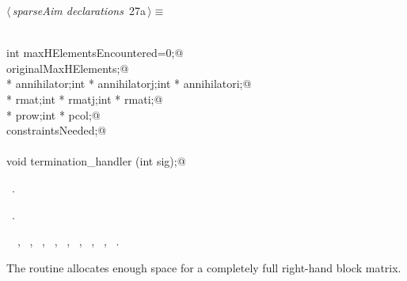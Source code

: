 \documentclass{article}
\begin{document}
\begin{flushleft} \small
\begin{minipage}{\linewidth}\label{scrap27}\raggedright\small
{} $\langle\,${\itshape sparseAim declarations}\nobreak\ {\footnotesize {27a}}$\,\rangle\equiv$
\vspace{-1ex}
\begin{list}{}{} \item
\mbox{}\verb@@\\
\mbox{}\verb@static int maxHElementsEncountered=0;@\\
\mbox{}\verb@int originalMaxHElements;@\\
\mbox{}\verb@double * annihilator;int * annihilatorj;int * annihilatori;@\\
\mbox{}\verb@double * rmat;int * rmatj;int * rmati;@\\
\mbox{}\verb@int * prow;int * pcol;@\\
\mbox{}\verb@int constraintsNeeded;@\\
\mbox{}\verb@@\\
\mbox{}\verb@static void termination_handler (int sig);@\\
\mbox{}\verb@@{\NWsep}
\end{list}
\vspace{-1.5ex}
\footnotesize
\begin{list}{}{\setlength{\itemsep}{-\parsep}\setlength{\itemindent}{-\leftmargin}}
\item \NWtxtMacroDefBy\ .
\item \NWtxtMacroRefIn\ .
\item \NWtxtIdentsUsed\nobreak\  \verb@annihilator@\nobreak\ , \verb@annihilatori@\nobreak\ , \verb@annihilatorj@\nobreak\ , \verb@maxHElementsEncountered@\nobreak\ , \verb@pcol@\nobreak\ , \verb@prow@\nobreak\ , \verb@rmat@\nobreak\ , \verb@rmati@\nobreak\ , \verb@rmatj@\nobreak\ .
\item{}
\end{list}
\end{minipage}\vspace{4ex}
\end{flushleft}
The routine allocates enough space for a completely full right-hand block matrix.
\end{document}
